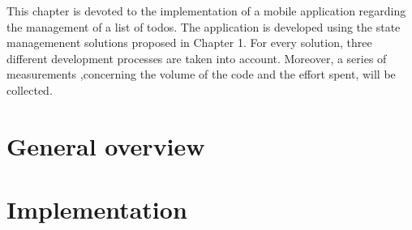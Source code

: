This chapter is devoted to the implementation of a mobile application regarding the management of a list of todos. The application is developed using the state managemenent solutions proposed in Chapter 1. For every solution, three different development processes are taken into account. Moreover, a series of measurements ,concerning the volume of the code and the effort spent, will be collected.
\section{General overview}
\label{sec:general_overview}


\section{Implementation}
\label{sec:implementation}

